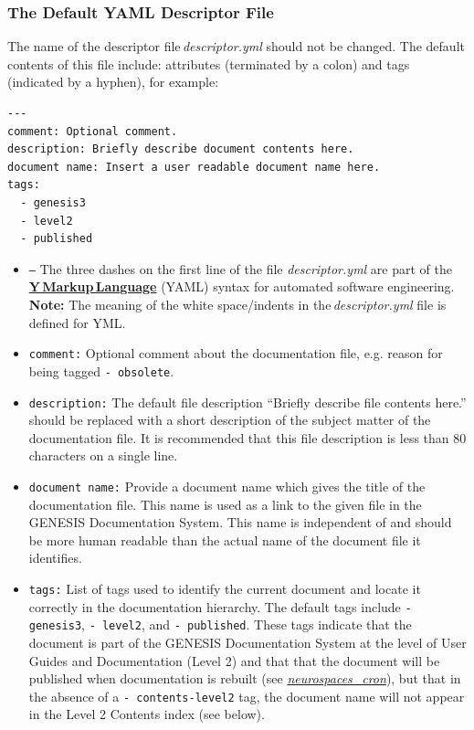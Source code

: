\documentclass[12pt]{article}
\begin{document}
\subsubsection*{The Default YAML Descriptor File}

The name of the descriptor file\,{\it descriptor.yml} should not be changed. The default contents of this file include: attributes (terminated by a colon) and tags (indicated by a hyphen), for example:

\begin{verbatim}
---
comment: Optional comment.
description: Briefly describe document contents here. 
document name: Insert a user readable document name here.
tags:
  - genesis3
  - level2
  - published
\end{verbatim}

\begin{itemize}

\item[]{\tt ---} The three dashes on the first line of the file {\it descriptor.yml} are part of the \href{http://yaml.org}{\bf Y\,Markup\,Language} (YAML) syntax for automated software engineering. \\
{\bf Note:} The meaning of the white space/indents in the\,{\it descriptor.yml} file is defined for YML.

\item[]{\tt comment:} Optional comment about the documentation file, e.g. reason for being tagged {\tt -\,obsolete}.

\item[]{\tt description:} The default file description ``Briefly describe file contents here.'' should be replaced with a short description of the subject matter of the documentation file. It is recommended that this file description is less than 80 characters on a single line.

\item[]{\tt document\,name:} Provide a document name which gives the title of the documentation file. This name is used as a link to the given file in the GENESIS Documentation System. This name is independent of and should be more human readable than the actual name of the document file it identifies.

\item[]{\tt tags:} List of tags used to identify the current document and locate it correctly in the documentation hierarchy. The default tags include {\tt -\,genesis3}, {\tt -\,level2}, and {\tt -\,published}. These tags indicate that the document is part of the GENESIS Documentation System at the level of User Guides and Documentation (Level 2) and that that the document will be published when documentation is rebuilt (see \href{../neurospaces-cron/neurospaces-cron.tex}{\it neurospaces\_cron}), but that in the absence of a {\tt - contents-level2} tag, the document name will not appear in the Level 2 Contents index (see below).


\end{itemize}
\end{document}
